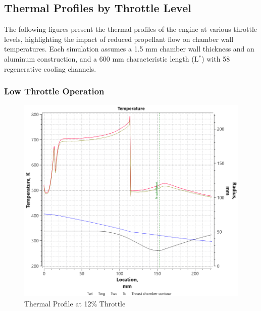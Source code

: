 \subsection{Thermal Profiles by Throttle Level}

The following figures present the thermal profiles of the engine at various throttle levels, highlighting the impact of reduced propellant flow on chamber wall temperatures. Each simulation assumes a 1.5 mm chamber wall thickness and an aluminum construction, and a 600 mm characteristic length (L$^*$) with 58 regenerative cooling channels.

\subsubsection{Low Throttle Operation}
\begin{figure}[H]
    \centering
    \includegraphics[width=\linewidth]{Images/12_throttle_80_20_2film3.8of_20xfilm_aluminum_1.5mmwall_600Lstar_rao_55channels.png}
    \caption{Thermal Profile at 12\% Throttle}
    \label{fig:12_throttle}
\end{figure}

